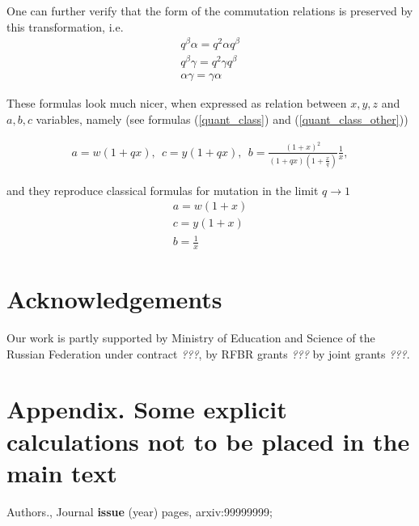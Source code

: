 \documentclass{article}
\newcommand{\lb}{\left (}
\newcommand{\rb}{\right )}
\newcommand{\be}{\begin{eqnarray}}
\newcommand{\ee}{\end{eqnarray}}
\newcommand {\?}{\textit{???}}
\def\classlim{q \rightarrow 1}
\newcommand{\delabel}[1]{(\ref{#1})}
\begin{document}
One can further verify that the form of the commutation relations is preserved by this transformation, i.e.
\be
q^{\beta} \alpha = q^2 \alpha q^{\beta} \\
q^{\beta} \gamma = q^2 \gamma q^{\beta} \\
\alpha \gamma = \gamma \alpha
\ee

These formulas look much nicer, when expressed as relation between $x, y, z$ and $a, b, c$
variables, namely (see formulas \delabel{quant_class} and \delabel{quant_class_other})

\be
\boxed{
  a = w (1 + q x),\ \ c = y(1 + q x), \ \ b = \frac{\lb 1 + x\rb^2}{\lb 1 + q x\rb\lb 1 + \frac{x}{q}\rb} \frac{1}{x},
}
\ee

and they reproduce classical formulas for mutation in the limit $\classlim$
\be
a = w \lb 1 + x\rb \\
c = y \lb 1 + x\rb \\
b = \frac{1}{x}
\ee


\section*{Acknowledgements}

Our work is partly supported by Ministry of Education and Science of
the Russian Federation under contract \?, by RFBR
grants \? by joint grants \?.

\appendix
\section{Appendix. Some explicit calculations not to be placed in the main text}

\begin{thebibliography}{12}

 Authors., Journal {\bf issue} (year) pages, arxiv:99999999;

\end{thebibliography}
\end{document}
